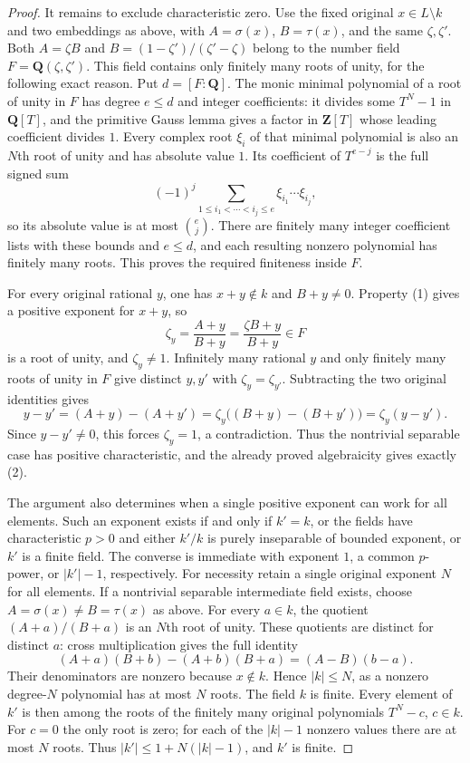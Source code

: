 \begin{proof}
It remains to exclude characteristic
zero. Use the fixed original $x\in L\setminus k$
and two embeddings as above, with
$A=\sigma(x)$, $B=\tau(x)$, and the
same $\zeta,\zeta'$. Both $A=\zeta B$
and $B=(1-\zeta')/(\zeta'-\zeta)$
belong to the number field
$F=\mathbf Q(\zeta,\zeta')$.
This field contains only finitely many
roots of unity, for the following exact
reason. Put $d=[F:\mathbf Q]$. The monic
minimal polynomial of a root of unity
in $F$ has degree $e\leq d$ and integer
coefficients: it divides some $T^N-1$
in $\mathbf Q[T]$, and the primitive
Gauss lemma gives a factor in $\mathbf Z[T]$
whose leading coefficient divides $1$.
Every complex root $\xi_i$ of that
minimal polynomial is also an $N$th
root of unity and has absolute value
$1$. Its coefficient of $T^{e-j}$ is
the full signed sum
$$
(-1)^j\sum_{1\leq i_1<\cdots<i_j\leq e}
\xi_{i_1}\cdots\xi_{i_j},
$$
so its absolute value is at most
$\binom ej$. There are finitely many
integer coefficient lists with these
bounds and $e\leq d$, and each resulting
nonzero polynomial has finitely many
roots. This proves the required
finiteness inside $F$.

For every original rational $y$, one
has $x+y\notin k$ and $B+y\neq0$.
Property (1) gives a positive exponent
for $x+y$, so
$$
\zeta_y=\frac{A+y}{B+y}
=\frac{\zeta B+y}{B+y}\in F
$$
is a root of unity, and $\zeta_y\neq1$.
Infinitely many rational $y$ and only
finitely many roots of unity in $F$
give distinct $y,y'$ with
$\zeta_y=\zeta_{y'}$. Subtracting the
two original identities gives
$$
y-y'=(A+y)-(A+y')
=\zeta_y\big((B+y)-(B+y')\big)
=\zeta_y(y-y').
$$
Since $y-y'\neq0$, this forces
$\zeta_y=1$, a contradiction. Thus the
nontrivial separable case has positive
characteristic, and the already proved
algebraicity gives exactly (2).

The argument also determines when a
single positive exponent can work for
all elements. Such an exponent exists
if and only if $k'=k$, or the fields
have characteristic $p>0$ and either
$k'/k$ is purely inseparable of bounded
exponent, or $k'$ is a finite field.
The converse is immediate with exponent
$1$, a common $p$-power, or $|k'|-1$,
respectively. For necessity retain a
single original exponent $N$ for all
elements. If a nontrivial separable
intermediate field exists, choose
$A=\sigma(x)\neq B=\tau(x)$ as above.
For every $a\in k$, the quotient
$(A+a)/(B+a)$ is an $N$th root of unity.
These quotients are distinct for
distinct $a$: cross multiplication
gives the full identity
$$
(A+a)(B+b)-(A+b)(B+a)=(A-B)(b-a).
$$
Their denominators are nonzero because
$x\notin k$. Hence $|k|\leq N$, as a
nonzero degree-$N$ polynomial has at
most $N$ roots. The field $k$ is finite.
Every element of $k'$ is then among
the roots of the finitely many original
polynomials $T^N-c$, $c\in k$. For
$c=0$ the only root is zero; for
each of the $|k|-1$ nonzero values
there are at most $N$ roots. Thus
$|k'|\leq1+N(|k|-1)$, and $k'$ is finite.


\end{proof}
